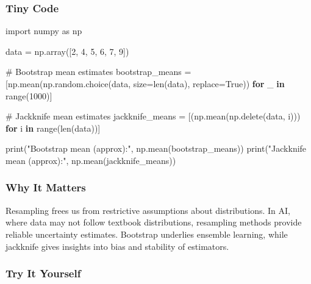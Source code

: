 \documentclass[
  letterpaper,
  DIV=11,
  numbers=noendperiod]{scrreprt}
\newenvironment{Shaded}{\begin{snugshade}}{\end{snugshade}}
\newcommand{\BuiltInTok}[1]{\textcolor[rgb]{0.00,0.23,0.31}{#1}}
\newcommand{\CommentTok}[1]{\textcolor[rgb]{0.37,0.37,0.37}{#1}}
\newcommand{\ControlFlowTok}[1]{\textcolor[rgb]{0.00,0.23,0.31}{\textbf{#1}}}
\newcommand{\DecValTok}[1]{\textcolor[rgb]{0.68,0.00,0.00}{#1}}
\newcommand{\ImportTok}[1]{\textcolor[rgb]{0.00,0.46,0.62}{#1}}
\newcommand{\KeywordTok}[1]{\textcolor[rgb]{0.00,0.23,0.31}{\textbf{#1}}}
\newcommand{\NormalTok}[1]{\textcolor[rgb]{0.00,0.23,0.31}{#1}}
\newcommand{\OperatorTok}[1]{\textcolor[rgb]{0.37,0.37,0.37}{#1}}
\newcommand{\StringTok}[1]{\textcolor[rgb]{0.13,0.47,0.30}{#1}}
\newcommand{\VariableTok}[1]{\textcolor[rgb]{0.07,0.07,0.07}{#1}}
\begin{document}
\subsubsection{Tiny Code}\label{tiny-code-137}

\begin{Shaded}
\begin{Highlighting}[]
\ImportTok{import}\NormalTok{ numpy }\ImportTok{as}\NormalTok{ np}

\NormalTok{data }\OperatorTok{=}\NormalTok{ np.array([}\DecValTok{2}\NormalTok{, }\DecValTok{4}\NormalTok{, }\DecValTok{5}\NormalTok{, }\DecValTok{6}\NormalTok{, }\DecValTok{7}\NormalTok{, }\DecValTok{9}\NormalTok{])}

\CommentTok{\# Bootstrap mean estimates}
\NormalTok{bootstrap\_means }\OperatorTok{=}\NormalTok{ [np.mean(np.random.choice(data, size}\OperatorTok{=}\BuiltInTok{len}\NormalTok{(data), replace}\OperatorTok{=}\VariableTok{True}\NormalTok{))}
                   \ControlFlowTok{for}\NormalTok{ \_ }\KeywordTok{in} \BuiltInTok{range}\NormalTok{(}\DecValTok{1000}\NormalTok{)]}

\CommentTok{\# Jackknife mean estimates}
\NormalTok{jackknife\_means }\OperatorTok{=}\NormalTok{ [(np.mean(np.delete(data, i))) }\ControlFlowTok{for}\NormalTok{ i }\KeywordTok{in} \BuiltInTok{range}\NormalTok{(}\BuiltInTok{len}\NormalTok{(data))]}

\BuiltInTok{print}\NormalTok{(}\StringTok{"Bootstrap mean (approx):"}\NormalTok{, np.mean(bootstrap\_means))}
\BuiltInTok{print}\NormalTok{(}\StringTok{"Jackknife mean (approx):"}\NormalTok{, np.mean(jackknife\_means))}
\end{Highlighting}
\end{Shaded}

\subsubsection{Why It Matters}\label{why-it-matters-35}

Resampling frees us from restrictive assumptions about distributions. In
AI, where data may not follow textbook distributions, resampling methods
provide reliable uncertainty estimates. Bootstrap underlies ensemble
learning, while jackknife gives insights into bias and stability of
estimators.

\subsubsection{Try It Yourself}\label{try-it-yourself-137}
\end{document}
